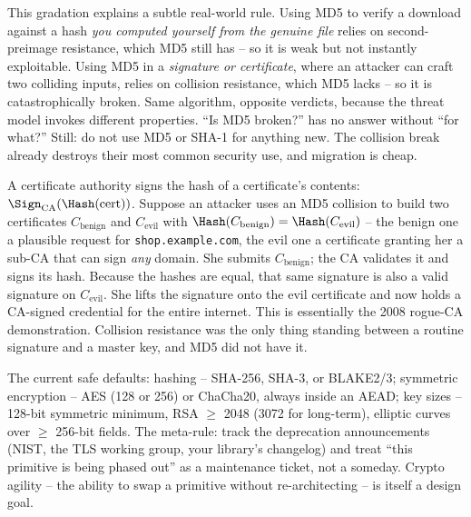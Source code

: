 \begin{trapbox}
This gradation explains a subtle real-world rule. Using MD5 to verify a download against a hash \emph{you computed yourself from the genuine file} relies on second-preimage resistance, which MD5 still has -- so it is weak but not instantly exploitable. Using MD5 in a \emph{signature or certificate}, where an attacker can craft two colliding inputs, relies on collision resistance, which MD5 lacks -- so it is catastrophically broken. Same algorithm, opposite verdicts, because the threat model invokes different properties. ``Is MD5 broken?'' has no answer without ``for what?'' Still: do not use MD5 or SHA-1 for anything new. The collision break already destroys their most common security use, and migration is cheap.
\end{trapbox}

\begin{example}
\label{ch38:ex-collision-cert}
A certificate authority signs the hash of a certificate's contents: $\Sign_{\text{CA}}(\Hash(\text{cert}))$. Suppose an attacker uses an MD5 collision to build two certificates $C_{\text{benign}}$ and $C_{\text{evil}}$ with $\Hash(C_{\text{benign}}) = \Hash(C_{\text{evil}})$ -- the benign one a plausible request for \texttt{shop.example.com}, the evil one a certificate granting her a sub-CA that can sign \emph{any} domain. She submits $C_{\text{benign}}$; the CA validates it and signs its hash. Because the hashes are equal, that same signature is also a valid signature on $C_{\text{evil}}$. She lifts the signature onto the evil certificate and now holds a CA-signed credential for the entire internet. This is essentially the 2008 rogue-CA demonstration. Collision resistance was the only thing standing between a routine signature and a master key, and MD5 did not have it.
\end{example}

\begin{focusbox}
The current safe defaults: hashing -- SHA-256, SHA-3, or BLAKE2/3; symmetric encryption -- AES (128 or 256) or ChaCha20, always inside an AEAD; key sizes -- 128-bit symmetric minimum, RSA $\ge$ 2048 (3072 for long-term), elliptic curves over $\ge$ 256-bit fields. The meta-rule: track the deprecation announcements (NIST, the TLS working group, your library's changelog) and treat ``this primitive is being phased out'' as a maintenance ticket, not a someday. Crypto agility -- the ability to swap a primitive without re-architecting -- is itself a design goal.
\end{focusbox}

